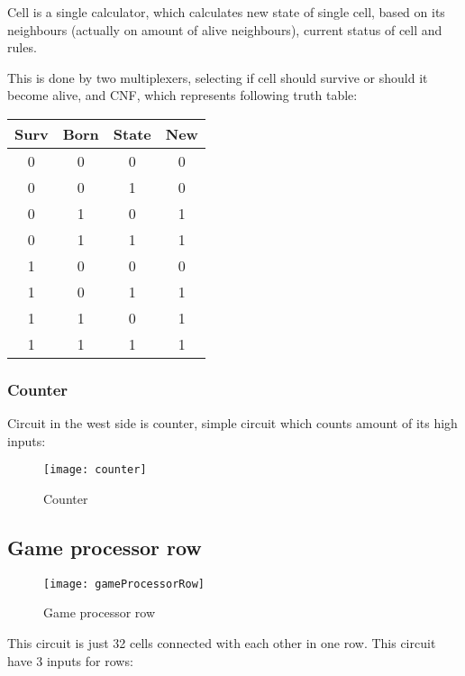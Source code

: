 Cell is a single calculator, which calculates new state of single cell, based on its neighbours (actually on amount of alive neighbours), current status of cell and rules.

This is done by two multiplexers, selecting if cell should survive or should it become alive, and CNF, which represents following truth table:

\begin{center}
	\begin{tabular}{|c|c|c|c|}
		\hline
		Surv & Born & State & New \\
		\hline
		0 & 0 & 0 & 0  \\
		\hline
		0 & 0 & 1 & 0 \\
		\hline
		0 & 1 & 0 & 1 \\
		\hline
		0 & 1 & 1 & 1 \\
		\hline
		1 & 0 & 0 & 0 \\
		\hline
		1 & 0 & 1 & 1 \\
		\hline
		1 & 1 & 0 & 1 \\
		\hline
		1 & 1 & 1 & 1 \\
		\hline
	\end{tabular}
\end{center}

\subsubsection*{Counter}

Circuit in the west side is counter, simple circuit which counts amount of its high inputs:

\begin{figure}[ht]
	\centering
	\texttt{[image: counter]}
	\caption{Counter}
\end{figure}

\subsection*{Game processor row}

\begin{figure}[ht]
	\centering
	\texttt{[image: gameProcessorRow]}
	\caption{Game processor row}
\end{figure}

This circuit is just 32 cells connected with each other in one row. This circuit have 3 inputs for rows:

